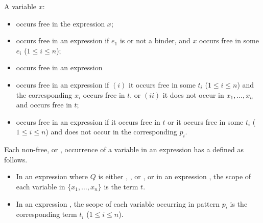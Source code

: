 \noindent A variable $x$:
\begin{itemize}
\item
occurs free in the expression $x$;
\item
occurs free in an expression 
if $e_1$ is  or not a binder, and 
$x$ occurs free in some $e_i$ ($1\le i\le n$); 
\item
occurs free in an expression 
\item
occurs free in an expression 
 if 
$(i)$ it occurs free in some $t_i$ ($1\le i\le n$) and 
the corresponding $x_i$ occurs free in $t$, or 
$(ii)$ it does not occur in $x_1, \ldots, x_n$ and occurs free in $t$;
\item
occurs free in an expression
if it occurs free in $t$ or it occurs free in some $t_i$ ($1\le i\le n$) and
does not occur in the corresponding $p_i$.
\end{itemize}


\noindent 
Each non-free, or , occurrence of a variable 
in an expression has a  defined as follows.

\begin{itemize}
\item
In an expression 
where $Q$ is either , , or , 
or in an expression ,
the scope of each variable in $\{x_1, \ldots, x_n\}$ is the term $t$.
\item
In an expression 
,
the scope of each variable occurring in pattern $p_i$ is the corresponding term $t_i$
($1\le i\le n$).
\end{itemize}

